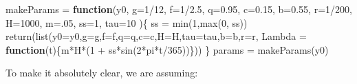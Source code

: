 \documentclass[
]{book}
\newenvironment{Shaded}{\begin{snugshade}}{\end{snugshade}}
\newcommand{\AttributeTok}[1]{\textcolor[rgb]{0.77,0.63,0.00}{#1}}
\newcommand{\ControlFlowTok}[1]{\textcolor[rgb]{0.13,0.29,0.53}{\textbf{#1}}}
\newcommand{\DecValTok}[1]{\textcolor[rgb]{0.00,0.00,0.81}{#1}}
\newcommand{\FloatTok}[1]{\textcolor[rgb]{0.00,0.00,0.81}{#1}}
\newcommand{\FunctionTok}[1]{\textcolor[rgb]{0.00,0.00,0.00}{#1}}
\newcommand{\NormalTok}[1]{#1}
\newcommand{\OtherTok}[1]{\textcolor[rgb]{0.56,0.35,0.01}{#1}}
\newcommand{\SpecialCharTok}[1]{\textcolor[rgb]{0.00,0.00,0.00}{#1}}
\begin{document}
\begin{Shaded}
\begin{Highlighting}[]
\NormalTok{makeParams }\OtherTok{=} \ControlFlowTok{function}\NormalTok{(y0, }
                      \AttributeTok{g=}\DecValTok{1}\SpecialCharTok{/}\DecValTok{12}\NormalTok{, }\AttributeTok{f=}\DecValTok{1}\SpecialCharTok{/}\FloatTok{2.5}\NormalTok{, }\AttributeTok{q=}\FloatTok{0.95}\NormalTok{,  }
                      \AttributeTok{c=}\FloatTok{0.15}\NormalTok{,}
                      \AttributeTok{b=}\FloatTok{0.55}\NormalTok{, }\AttributeTok{r=}\DecValTok{1}\SpecialCharTok{/}\DecValTok{200}\NormalTok{, }\AttributeTok{H=}\DecValTok{1000}\NormalTok{,  }
                      \AttributeTok{m=}\NormalTok{.}\DecValTok{05}\NormalTok{, }\AttributeTok{ss=}\DecValTok{1}\NormalTok{,  }
                      \AttributeTok{tau=}\DecValTok{10}  
\NormalTok{                      )\{}
\NormalTok{  ss }\OtherTok{=} \FunctionTok{min}\NormalTok{(}\DecValTok{1}\NormalTok{,}\FunctionTok{max}\NormalTok{(}\DecValTok{0}\NormalTok{, ss))}
\FunctionTok{return}\NormalTok{(}\FunctionTok{list}\NormalTok{(}\AttributeTok{y0=}\NormalTok{y0,}\AttributeTok{g=}\NormalTok{g,}\AttributeTok{f=}\NormalTok{f,}\AttributeTok{q=}\NormalTok{q,}\AttributeTok{c=}\NormalTok{c,}\AttributeTok{H=}\NormalTok{H,}\AttributeTok{tau=}\NormalTok{tau,}\AttributeTok{b=}\NormalTok{b,}\AttributeTok{r=}\NormalTok{r,}
  \AttributeTok{Lambda =} \ControlFlowTok{function}\NormalTok{(t)\{m}\SpecialCharTok{*}\NormalTok{H}\SpecialCharTok{*}\NormalTok{(}\DecValTok{1} \SpecialCharTok{+}\NormalTok{ ss}\SpecialCharTok{*}\FunctionTok{sin}\NormalTok{(}\DecValTok{2}\SpecialCharTok{*}\NormalTok{pi}\SpecialCharTok{*}\NormalTok{t}\SpecialCharTok{/}\DecValTok{365}\NormalTok{))\})) }
\NormalTok{\} }
\NormalTok{params }\OtherTok{=} \FunctionTok{makeParams}\NormalTok{(y0)}
\end{Highlighting}
\end{Shaded}

To make it absolutely clear, we are assuming:
\end{document}

